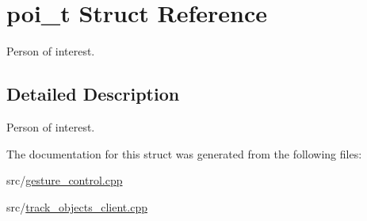 \hypertarget{structpoi__t}{}\section{poi\+\_\+t Struct Reference}
\label{structpoi__t}


Person of interest.  




\subsection{Detailed Description}
Person of interest. 

The documentation for this struct was generated from the following files\+:\begin{DoxyCompactItemize}
\item 
src/\hyperlink{gesture__control_8cpp}{gesture\+\_\+control.\+cpp}\item 
src/\hyperlink{track__objects__client_8cpp}{track\+\_\+objects\+\_\+client.\+cpp}\end{DoxyCompactItemize}
